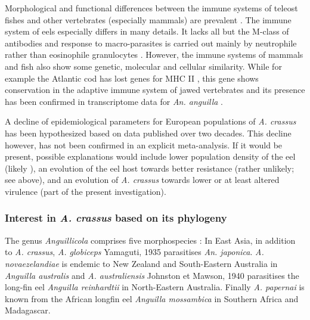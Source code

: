 Morphological and functional differences between the immune systems of
teleost fishes and other vertebrates (especially mammals) are
prevalent \cite{press1999morphology}. The immune system of eels
especially differs in many details. It lacks all but the M-class of
antibodies and response to macro-parasites is carried out mainly by
neutrophile rather than eosinophile granulocytes
\cite{nielsen_eel_2006}. However, the immune systems of mammals and
fish also show some genetic, molecular and cellular similarity. While
for example the Atlantic cod has lost genes for MHC II
\cite{pmid21832995}, this gene shows conservation in the adaptive
immune system of jawed vertebrates \cite{pmid21078341} and its presence
has been confirmed in transcriptome data for \textit{An. anguilla}
\cite{pmid17666525}.

A decline of epidemiological parameters for European populations of
\textit{A. crassus} has been hypothesized based on data published over
two decades. This decline however, has not been confirmed in an
explicit meta-analysis. If it would be present, possible explanations
would include lower population density of the eel (likely
\cite{schabuss_dynamics_2005}), an evolution of the eel host towards
better resistance (rather unlikely; see above), and an evolution of
\textit{A. crassus} towards lower or at least altered virulence (part
of the present investigation).

\subsubsection{Interest in \textit{A. crassus} based on its
    phylogeny}
\label{phyl-int}

The genus \textit{Anguillicola} comprises five morphospecies
\cite{taraschewski_revision_1988}: In East Asia, in addition to
\textit{A. crassus}, \textit{A. globiceps} Yamaguti, 1935
\cite{yamaguti_globiceps} parasitises \textit{An.
  japonica}. \textit{A. novaezelandiae} is endemic to New Zealand and
South-Eastern Australia in \textit{Anguilla australis} and
\textit{A. australiensis} Johnston et Mawson, 1940
\cite{johnston1940some} parasitises the long-fin eel \textit{Anguilla
  reinhardtii} in North-Eastern Australia. Finally
\textit{A. papernai} is known from the African longfin eel
\textit{Anguilla mossambica} in Southern Africa and Madagascar.


